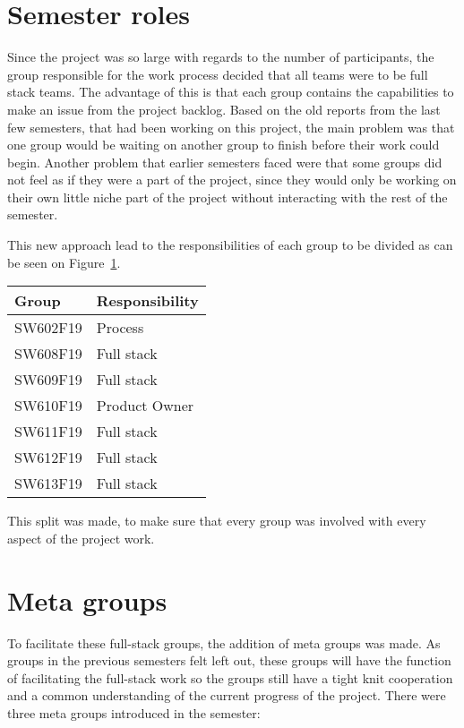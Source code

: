 \section{Semester roles}
Since the project was so large with regards to the number of participants, the group responsible for the work process decided that all teams were to be full stack teams.
The advantage of this is that each group contains the capabilities to make an issue from the project backlog.
Based on the old reports from the last few semesters, that had been working on this project, the main problem was that one group would be waiting on another group to finish before their work could begin.
Another problem that earlier semesters faced were that some groups did not feel as if they were a part of the project, since they would only be working on their own little niche part of the project without interacting with the rest of the semester.

This new approach lead to the responsibilities of each group to be divided as can be seen on Figure~\ref{TBL:GroupResponsibility}.
\begin{table}[H]
\centering
\begin{tabular}{|l|l|}
\hline
\textbf{Group} & \textbf{Responsibility} \\ \hline
SW602F19 & Process\\ \hline
SW608F19 & Full stack\\ \hline
SW609F19 & Full stack\\ \hline
SW610F19 & Product Owner  \\ \hline
SW611F19 & Full stack \\ \hline
SW612F19 & Full stack \\ \hline
SW613F19 & Full stack \\ \hline
\end{tabular}
\label{TBL:GroupResponsibility}
\end{table}

This split was made, to make sure that every group was involved with every aspect of the project work.
\section{Meta groups}
To facilitate these full-stack groups, the addition of meta groups was made. As groups in the previous semesters felt left out, these groups will have the function of facilitating the full-stack work so the groups still have a tight knit cooperation and a common understanding of the current progress of the project.
There were three meta groups introduced in the semester:

